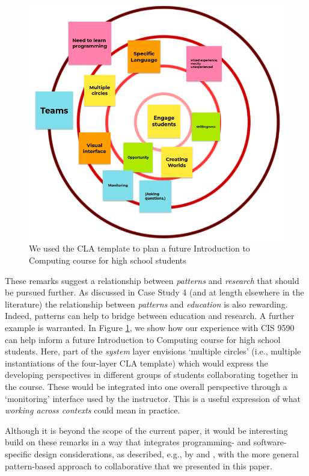 \documentclass[acmlarge,timestamp]{acmart}
\begin{document}
\begin{figure}
\includegraphics[width=.7\textwidth]{sridevi-course.png}
\caption{We used the CLA template to plan a future Introduction to Computing course for high school students\label{sridevi-course}}
\end{figure}

These remarks suggest a relationship between \emph{patterns} and
\emph{research} that should be pursued further.  As discussed in Case
Study 4 (and at length elsewhere in the literature) the relationship
between \emph{patterns} and \emph{education} is also rewarding.
Indeed, patterns can help to bridge between education and research.  A
further example is warranted.  In Figure \ref{sridevi-course}, we show
how our experience with CIS 9590 can help inform a future Introduction
to Computing course for high school students.  Here, part of the
\emph{system} layer envisions ‘multiple circles’ (i.e., multiple
instantiations of the four-layer CLA template) which would express the
developing perspectives in different groups of students collaborating
together in the course.  These would be integrated into one overall
perspective through a ‘monitoring’ interface used by the instructor.
This is a useful expression of what \emph{working across contexts}
could mean in practice.

Although it is beyond the scope of the current paper, it would be
interesting build on these remarks in a way that integrates
programming- and software-specific design considerations, as
described, e.g., by \citet{felleisen2018design} and
\citet{lowy2019righting}, with the more general pattern-based approach
to collaborative that we presented in this paper.

\FloatBarrier
\end{document}
